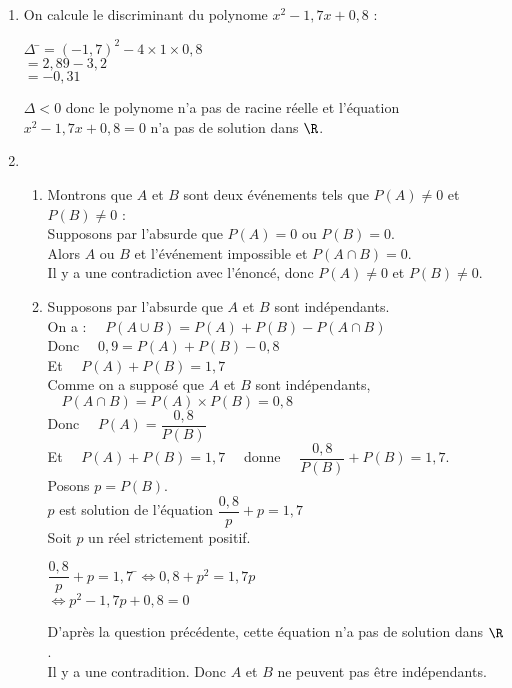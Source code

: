 \documentclass[a4paper,11pt,exos]{nsi} %
\begin{document}
\begin{enumerate}
    \item On calcule le discriminant du polynome $x^2-1,7x+0,8$ :
    \begin{tabbing}
        $\Delta$ \=$=(-1,7)^2-4\times 1\times 0,8$\\
                \>$=2,89-3,2$\\
                \>$=-0,31$
    \end{tabbing}
    $\Delta<0$ donc le polynome n'a pas de racine réelle et l'équation $x^2-1,7x+0,8=0$ n'a pas de solution dans $\R$.
    \item \begin{enumerate}[label =\textbullet]
        \item Montrons que $A$ et $B$ sont deux événements tels que $P(A)\neq 0$ et $P(B)\neq 0$ :\\[.5em]
        Supposons par l'absurde que $P(A)=0$ ou $P(B)=0$.\\
        Alors $A$ ou $B$ et l'événement impossible et $P(A\cap B)=0$.\\
        Il y a une contradiction avec l'énoncé, donc $P(A)\neq 0$ et $P(B)\neq 0$.
        \item Supposons par l'absurde que $A$ et $B$ sont indépendants.\\[.5em]
        On a : $\quad P(A\cup B)= P(A) + P(B) - P(A\cap B)$\\
        Donc $\quad 0,9 = P(A) + P(B) - 0,8$\\
        Et $\quad P(A) + P(B) = 1,7$\\[.5em]
        Comme on a supposé que $A$ et $B$ sont indépendants,  $\quad P(A\cap B) = P(A)\times P(B)=0,8$\\
        Donc $\quad P(A)=\dfrac{0,8}{P(B)}$\\
        Et $\quad P(A)+P(B)=1,7\quad$ donne $\quad \dfrac{0,8}{P(B)}+P(B)=1,7$.\\
        Posons $p=P(B)$.\\
        $p$ est solution de l'équation $\dfrac{0,8}{p}+p=1,7$\\ 
        Soit $p$ un réel strictement positif.
        \begin{tabbing}
            $\dfrac{0,8}{p}+p=1,7$  \=$\iff 0,8+p^2=1,7p$\\
                                    \>$\iff p^2-1,7p+0,8=0$
        \end{tabbing}
        D'après la question précédente, cette équation n'a pas de solution dans $\R$.\\
        Il y a une contradition. Donc $A$ et $B$ ne peuvent pas être indépendants.
    \end{enumerate}
\end{enumerate}
\end{document}
